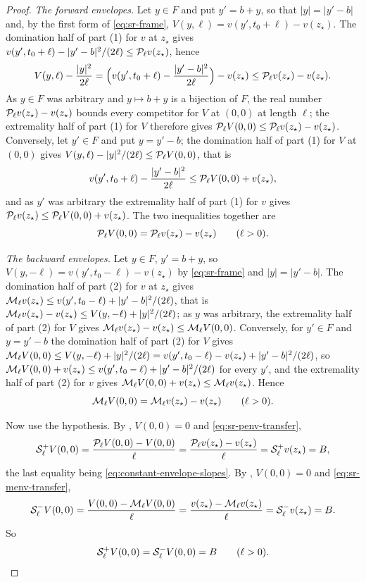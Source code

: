 \begin{proof}
\emph{The forward envelopes.} Let $y\in F$ and put $y'=b+y$, so that
$|y|=|y'-b|$ and, by the first form of \eqref{eq:sr-frame},
$V(y,\ell)=v(y',t_0+\ell)-v(z_\star)$. The domination half of part (1) for $v$
at $z_\star$ gives $v(y',t_0+\ell)-|y'-b|^2/(2\ell)\le\mathcal{P}_\ell v(z_\star)$,
hence
\[
  V(y,\ell)-\frac{|y|^2}{2\ell}
   =\Bigl(v(y',t_0+\ell)-\frac{|y'-b|^2}{2\ell}\Bigr)-v(z_\star)
   \le\mathcal{P}_\ell v(z_\star)-v(z_\star).
\]
As $y\in F$ was arbitrary and $y\mapsto b+y$ is a bijection of $F$, the real
number $\mathcal{P}_\ell v(z_\star)-v(z_\star)$ bounds every competitor for $V$ at
$(0,0)$ at length $\ell$; the extremality half of part (1) for $V$ therefore
gives $\mathcal{P}_\ell V(0,0)\le\mathcal{P}_\ell v(z_\star)-v(z_\star)$. Conversely, let
$y'\in F$ and put $y=y'-b$; the domination half of part (1) for $V$ at $(0,0)$
gives $V(y,\ell)-|y|^2/(2\ell)\le\mathcal{P}_\ell V(0,0)$, that is
\[
  v(y',t_0+\ell)-\frac{|y'-b|^2}{2\ell}\le\mathcal{P}_\ell V(0,0)+v(z_\star),
\]
and as $y'$ was arbitrary the extremality half of part (1) for $v$ gives
$\mathcal{P}_\ell v(z_\star)\le\mathcal{P}_\ell V(0,0)+v(z_\star)$. The two inequalities
together are
\begin{equation}\label{eq:sr-penv-transfer}
  \mathcal{P}_\ell V(0,0)=\mathcal{P}_\ell v(z_\star)-v(z_\star)\qquad(\ell>0).
\end{equation}

\emph{The backward envelopes.} Let $y\in F$, $y'=b+y$, so
$V(y,-\ell)=v(y',t_0-\ell)-v(z_\star)$ by \eqref{eq:sr-frame} and
$|y|=|y'-b|$. The domination half of part (2) for $v$ at $z_\star$ gives
$\mathcal{M}_\ell v(z_\star)\le v(y',t_0-\ell)+|y'-b|^2/(2\ell)$, that is
$\mathcal{M}_\ell v(z_\star)-v(z_\star)\le V(y,-\ell)+|y|^2/(2\ell)$; as $y$ was
arbitrary, the extremality half of part (2) for $V$ gives
$\mathcal{M}_\ell v(z_\star)-v(z_\star)\le\mathcal{M}_\ell V(0,0)$. Conversely, for
$y'\in F$ and $y=y'-b$ the domination half of part (2) for $V$ gives
$\mathcal{M}_\ell V(0,0)\le V(y,-\ell)+|y|^2/(2\ell)
 =v(y',t_0-\ell)-v(z_\star)+|y'-b|^2/(2\ell)$, so
$\mathcal{M}_\ell V(0,0)+v(z_\star)\le v(y',t_0-\ell)+|y'-b|^2/(2\ell)$ for every
$y'$, and the extremality half of part (2) for $v$ gives
$\mathcal{M}_\ell V(0,0)+v(z_\star)\le\mathcal{M}_\ell v(z_\star)$. Hence
\begin{equation}\label{eq:sr-menv-transfer}
  \mathcal{M}_\ell V(0,0)=\mathcal{M}_\ell v(z_\star)-v(z_\star)\qquad(\ell>0).
\end{equation}

Now use the hypothesis. By , $V(0,0)=0$ and
\eqref{eq:sr-penv-transfer},
\[
  \mathcal{S}_\ell^+V(0,0)=\frac{\mathcal{P}_\ell V(0,0)-V(0,0)}{\ell}
   =\frac{\mathcal{P}_\ell v(z_\star)-v(z_\star)}{\ell}=\mathcal{S}_\ell^+v(z_\star)=B,
\]
the last equality being \eqref{eq:constant-envelope-slopes}. By
, $V(0,0)=0$ and \eqref{eq:sr-menv-transfer},
\[
  \mathcal{S}_\ell^-V(0,0)=\frac{V(0,0)-\mathcal{M}_\ell V(0,0)}{\ell}
   =\frac{v(z_\star)-\mathcal{M}_\ell v(z_\star)}{\ell}=\mathcal{S}_\ell^-v(z_\star)=B .
\]
So
\begin{equation}\label{eq:sr-slopes}
  \mathcal{S}_\ell^+V(0,0)=\mathcal{S}_\ell^-V(0,0)=B\qquad(\ell>0).
\end{equation}


\end{proof}

